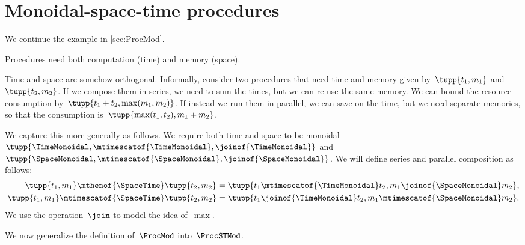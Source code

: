 \section{Monoidal-space-time procedures}
\label{subsec:monoidal-space-time}
We continue the example in \cref{sec:ProcMod}.

Procedures need both computation (time) and memory (space).

Time and space are somehow orthogonal.
%
Informally, consider two procedures that need time and memory given by~$\tupp{t_1,m_1}$ and~$\tupp{t_2, m_2}$.
If we compose them in series, we need to sum the times, but we can re-use the same memory.
We can bound the resource consumption by~$\tupp{t_1+t_2,\max(m_1, m_2)}$.
If instead we run them in parallel, we can save on the time, but we need separate memories, so that the consumption is~$\tupp{\max(t_1,t_2), m_1 + m_2}$.

We capture this more generally as follows.
We require both time and space to be monoidal ~$\tupp{\TimeMonoidal, \mtimescatof{\TimeMonoidal}, \joinof{\TimeMonoidal}}$ and~$\tupp{\SpaceMonoidal, \mtimescatof{\SpaceMonoidal}, \joinof{\SpaceMonoidal}}$.
%
We will define series and parallel composition as follows:
\begin{equation}
    \begin{aligned}
        \tupp{t_1,m_1} \mthenof {\SpaceTime} \tupp{t_2,m_2}    & = \tupp{t_1 \mtimescatof{\TimeMonoidal} t_2, m_1 \joinof{\SpaceMonoidal} m_2}, \\
        \tupp{t_1,m_1} \mtimescatof{\SpaceTime} \tupp{t_2,m_2} & = \tupp{t_1 \joinof{\TimeMonoidal} t_2, m_1 \mtimescatof{\SpaceMonoidal} m_2}.
    \end{aligned}
\end{equation}
We use the  operation~$\join$ to model the idea of~$\max$.

We now generalize the definition of~$\ProcMod$ into~$\ProcSTMod$.


